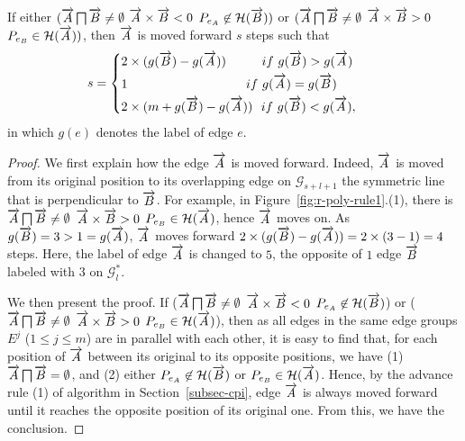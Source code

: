 \begin{prop}
\label{prop-rule1}
If either $(\protect\overrightarrow{A} \bigsqcap \protect\overrightarrow{B} \ne \emptyset$ \And $\protect\overrightarrow{A} \times \protect\overrightarrow{B} < 0$ \And $P_{e_A} \not \in \mathcal{H}(\protect\overrightarrow{B}))$ or $(\protect\overrightarrow{A} \bigsqcap \protect\overrightarrow{B} \ne \emptyset$ \And $\protect\overrightarrow{A} \times \protect\overrightarrow{B} > 0$ \And $P_{e_B} \in \mathcal{H}(\protect\overrightarrow{A}))$, then $\protect\overrightarrow{A}$ is moved forward $s$ steps such that
\begin{equation*}
\label{equ-rule1}
\small
    \hspace{2ex} s =  \left\{
    \begin{aligned}
        & 2\times(g(\vv{B}) - g(\vv{A}))  \hspace{5ex}~~if  ~g(\vv{B}) > g(\vv{A}) \\
        & {1}              \hspace{21ex}~if  ~g(\vv{A}) = g(\vv{B}) \\
        & 2\times(m+g(\vv{B}) - g(\vv{A})) ~~if  ~g(\vv{B}) < g(\vv{A}), \\
    \end{aligned}
    \right.       \hspace{6ex}{}
\end{equation*}
in which $g(e)$ denotes the label of edge $e$.
\end{prop}



\begin{proof}
We first explain how the edge $\protect\overrightarrow{A}$ is moved forward.
Indeed, $\protect\overrightarrow{A}$ is moved from its original position to its overlapping edge on $\mathcal{G}_{s+l+1}$ \wrt the symmetric line that is perpendicular to $\protect\overrightarrow{B}$.
For example, in Figure~\ref{fig:r-poly-rule1}.(1), there is $\protect\overrightarrow{A} \bigsqcap \protect\overrightarrow{B} \ne \emptyset$ \And $\protect\overrightarrow{A} \times \protect\overrightarrow{B} > 0$ \And $P_{e_B} \in \mathcal{H}(\protect\overrightarrow{A})$, hence $\protect\overrightarrow{A}$ moves on. As $g(\protect\overrightarrow{B})=3 > 1=g(\protect\overrightarrow{A})$, $\protect\overrightarrow{A}$ moves forward $2\times(g(\protect\overrightarrow{B}) - g(\protect\overrightarrow{A})) = 2\times(3-1)= 4$ steps.
Here, the label of edge $\protect\overrightarrow{A}$ is changed to $5$, the opposite of $1$ \wrt edge $\protect\overrightarrow{B}$ labeled with $3$ on $\mathcal{G}^*_{l}$.

We then present the proof.
If ($\protect\overrightarrow{A} \bigsqcap \protect\overrightarrow{B} \ne \emptyset$ \And $\protect\overrightarrow{A} \times \protect\overrightarrow{B} < 0$ \And $P_{e_A} \not \in \mathcal{H}(\protect\overrightarrow{B})$) or ($\protect\overrightarrow{A} \bigsqcap \protect\overrightarrow{B} \ne \emptyset$ \And $\protect\overrightarrow{A} \times \protect\overrightarrow{B} > 0$ \And $P_{e_B} \in \mathcal{H}(\protect\overrightarrow{A})$), then as all edges in the same edge groups $E^j$ ($1\le j\le m$) are in parallel with each other, it is easy to find that, for each position of $\protect\overrightarrow{A}$ between its original to its opposite positions, we have (1) $\protect\overrightarrow{A} \bigsqcap \protect\overrightarrow{B} = \emptyset$, and (2) either $P_{e_A} \not \in \mathcal{H}(\protect\overrightarrow{B})$ or $P_{e_B} \in \mathcal{H}(\protect\overrightarrow{A})$. Hence, by the advance rule (1) of algorithm \cpia in Section~\ref{subsec-cpi}, edge $\protect\overrightarrow{A}$ is always moved forward until it reaches the opposite position of its original one. From this, we have the conclusion.
\end{proof}






